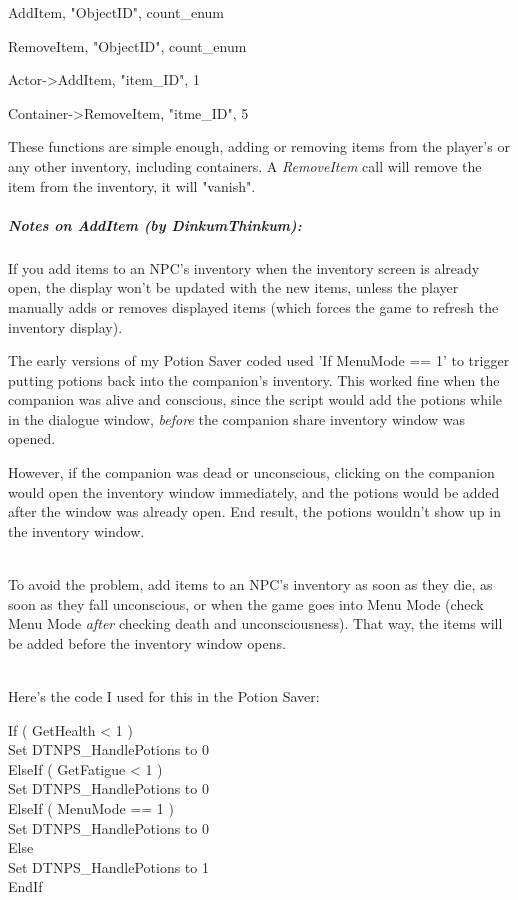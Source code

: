 \documentclass[
]{article}
\begin{document}
AddItem, "ObjectID", count\_enum

RemoveItem, "ObjectID", count\_enum

Actor-\textgreater AddItem, "item\_ID", 1

Container-\textgreater RemoveItem, "itme\_ID", 5

These functions are simple enough, adding or removing items from the
player's or any other inventory, including containers. A
\emph{RemoveItem} call will remove the item from the inventory, it will
"vanish".

\hypertarget{notes-on-additem-by-dinkumthinkum}{%
\subparagraph{Notes on AddItem (by
DinkumThinkum):}\label{notes-on-additem-by-dinkumthinkum}}

If you add items to an NPC's inventory when the inventory screen is
already open, the display won't be updated with the new items, unless
the player manually adds or removes displayed items (which forces the
game to refresh the inventory display).

The early versions of my Potion Saver coded used 'If MenuMode == 1' to
trigger putting potions back into the companion's inventory. This worked
fine when the companion was alive and conscious, since the script would
add the potions while in the dialogue window, \emph{before} the
companion share inventory window was opened.

However, if the companion was dead or unconscious, clicking on the
companion would open the inventory window immediately, and the potions
would be added after the window was already open. End result, the
potions wouldn't show up in the inventory window.\\
\strut \\
To avoid the problem, add items to an NPC's inventory as soon as they
die, as soon as they fall unconscious, or when the game goes into Menu
Mode (check Menu Mode \emph{after} checking death and unconsciousness).
That way, the items will be added before the inventory window opens.\\
\strut \\
Here's the code I used for this in the Potion Saver:

If ( GetHealth \textless{} 1 )\\
Set DTNPS\_HandlePotions to 0\\
ElseIf ( GetFatigue \textless{} 1 )\\
Set DTNPS\_HandlePotions to 0\\
ElseIf ( MenuMode == 1 )\\
Set DTNPS\_HandlePotions to 0\\
Else\\
Set DTNPS\_HandlePotions to 1\\
EndIf
\end{document}
